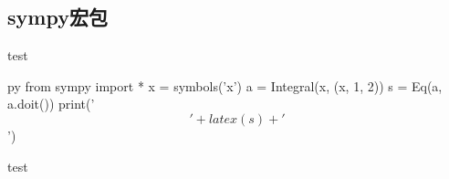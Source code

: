 \documentclass[11pt,oneside]{book}
\begin{document}
\begin{common-format}
\chapter{sympy宏包}
test
\begin{xverbatim}[129]{py}
from sympy import *
x = symbols('x')
a = Integral(x, (x, 1, 2))
s = Eq(a, a.doit())
print('$$'+ latex(s) + '$$')
\end{xverbatim}
test































































\end{common-format}
\end{document}
